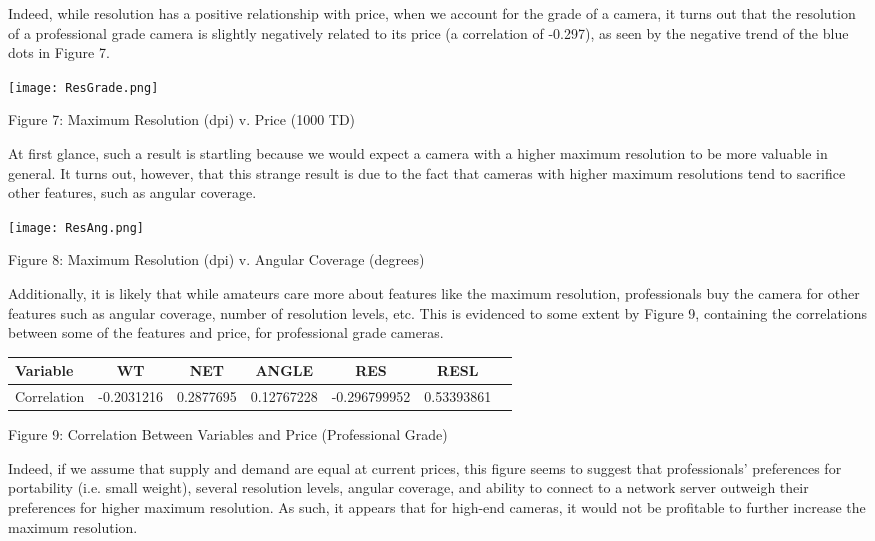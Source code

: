\documentclass[12pt]{article}
\begin{document}
Indeed, while resolution has a positive relationship with price, when we account for the grade of a camera, it turns out that the resolution of a professional grade camera is slightly negatively related to its price (a correlation of -0.297), as seen by the negative trend of the blue dots in Figure 7.\\

{\centering
\texttt{[image: ResGrade.png]}\par\smallskip}

{\centering
Figure 7: Maximum Resolution (dpi) v. Price (1000 TD)\par\bigskip}

\pagebreak
At first glance, such a result is startling because we would expect a camera with a higher maximum resolution to be more valuable in general. It turns out, however, that this strange result is due to the fact that cameras with higher maximum resolutions tend to sacrifice other features, such as angular coverage.\\

{\centering
\texttt{[image: ResAng.png]}\par\smallskip}

{\centering
Figure 8: Maximum Resolution (dpi) v. Angular Coverage (degrees)\par\bigskip}

Additionally, it is likely that while amateurs care more about features like the maximum resolution, professionals buy the camera for other features such as angular coverage, number of resolution levels, etc. This is evidenced to some extent by Figure 9, containing the correlations between some of the features and price, for professional grade cameras.\\

{\centering
\begin{tabular}{l*{5}{c}r}
Variable              & WT & NET & ANGLE & RES & RESL\\
\hline
Correlation & -0.2031216  & 0.2877695 & 0.12767228 & -0.296799952 & 0.53393861  \\
\end{tabular}\par\smallskip}

{\centering
Figure 9: Correlation Between Variables and Price (Professional Grade) \par\bigskip}

Indeed, if we assume that supply and demand are equal at current prices, this figure seems to suggest that professionals' preferences for portability (i.e. small weight), several resolution levels, angular coverage, and ability to connect to a network server outweigh their preferences for higher maximum resolution. As such, it appears that for high-end cameras, it would not be profitable to further increase the maximum resolution. 
\end{document}
